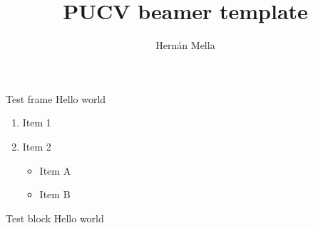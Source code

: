 \documentclass[11pt,aspectratio=169]{beamer}
\title[Short title]{PUCV beamer template}
\author[Name Surname]{Hernán Mella}
\institute[PUCV email]{School of foo \\ Pontificia Universidad Católica de Valparaíso}
\begin{document}
\maketitle

\begin{frame}{Test frame}
  Hello world

  \begin{enumerate}
    \item Item 1
    \item Item 2
    \begin{itemize}
      \item Item A
      \item Item B
    \end{itemize}
  \end{enumerate}

  \begin{block}{Test block}
    Hello world
  \end{block}
  
\end{frame}
\end{document}
